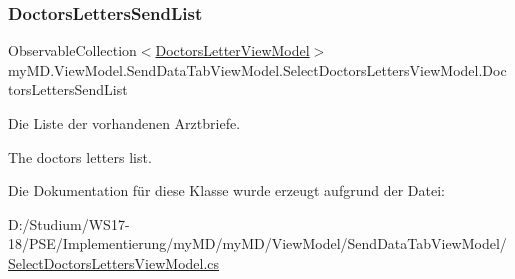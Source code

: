 \subsubsection{\texorpdfstring{Doctors\+Letters\+Send\+List}{DoctorsLettersSendList}}
{\footnotesize\ttfamily Observable\+Collection$<$\mbox{\hyperlink{classmy_m_d_1_1_view_model_1_1_overview_tab_view_model_1_1_doctors_letter_view_model}{Doctors\+Letter\+View\+Model}}$>$ my\+M\+D.\+View\+Model.\+Send\+Data\+Tab\+View\+Model.\+Select\+Doctors\+Letters\+View\+Model.\+Doctors\+Letters\+Send\+List\hspace{0.3cm}{\ttfamily [get]}}



Die Liste der vorhandenen Arztbriefe. 

The doctors letters list.

Die Dokumentation für diese Klasse wurde erzeugt aufgrund der Datei\+:\begin{DoxyCompactItemize}
\item 
D\+:/\+Studium/\+W\+S17-\/18/\+P\+S\+E/\+Implementierung/my\+M\+D/my\+M\+D/\+View\+Model/\+Send\+Data\+Tab\+View\+Model/\mbox{\hyperlink{_select_doctors_letters_view_model_8cs}{Select\+Doctors\+Letters\+View\+Model.\+cs}}\end{DoxyCompactItemize}
